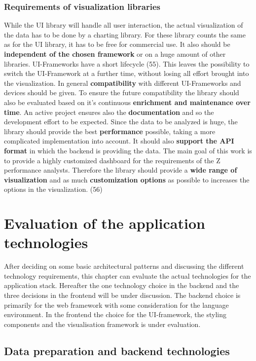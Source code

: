\documentclass[american,a4paper,oneside,,tablecaptionabove]{scrbook}
\begin{document}
\subsection{Requirements of visualization libraries}\label{sec:viz-req}

While the UI library will handle all user interaction, the actual
visualization of the data has to be done by a charting library. For
these library counts the same as for the UI library, it has to be free
for commercial use. It also should be \textbf{independent of the chosen
framework} or on a huge amount of other libraries. UI-Frameworks have a
short lifecycle (55). This leaves the possibility to switch the
UI-Framework at a further time, without losing all effort brought into
the visualization. In general \textbf{compatibility} with different
UI-Frameworks and devices should be given. To ensure the future
compatibility the library should also be evaluated based on it's
continuous \textbf{enrichment and maintenance over time}. An active
project ensures also the \textbf{documentation} and so the development
effort to be expected. Since the data to be analyzed is huge, the
library should provide the best \textbf{performance} possible, taking a
more complicated implementation into account. It should also
\textbf{support the API format} in which the backend is providing the
data. The main goal of this work is to provide a highly customized
dashboard for the requirements of the Z performance analysts. Therefore
the library should provide a \textbf{wide range of visualization} and as
much \textbf{customization options} as possible to increases the options
in the visualization. (56)

\chapter{Evaluation of the application
technologies}\label{evaluation-of-the-application-technologies}

After deciding on some basic architectural patterns and discussing the
different technology requirements, this chapter can evaluate the actual
technologies for the application stack. Hereafter the one technology
choice in the backend and the three decisions in the frontend will be
under discussion. The backend choice is primarily for the web framework
with some consideration for the language environment. In the frontend
the choice for the UI-framework, the styling components and the
visualisation framework is under evaluation.

\section{Data preparation and backend
technologies}\label{sec:backend-tec}
\end{document}
